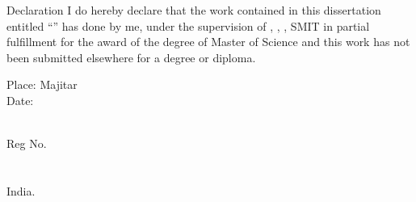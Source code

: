 \begin{preface}{Declaration}
I do hereby declare that the work contained in this dissertation entitled ``\textbf{\textsc{\thesistitle}}'' 
has done by me, under the supervision of {\guidename},
{\guidedesignation}, {\department}, SMIT in partial fulfillment
for the award of the degree of Master of Science and
this work has not been submitted elsewhere for a degree or diploma.

\vspace*{1in}
\begin{minipage}[t]{0.4\textwidth}
\baselineskip=18pt Place: Majitar \\
\baselineskip=18pt Date: 
\end{minipage}
\begin{minipage}[t]{0.5\textwidth}
\begin{center}
    {\bf    \studentname}\\
   \baselineskip=18pt  Reg No. \regno\\
    \baselineskip=18pt  \department\\
   \baselineskip=18pt  \institute\\
   \baselineskip=18pt  India.
\end{center}
\end{minipage}
\end{preface}